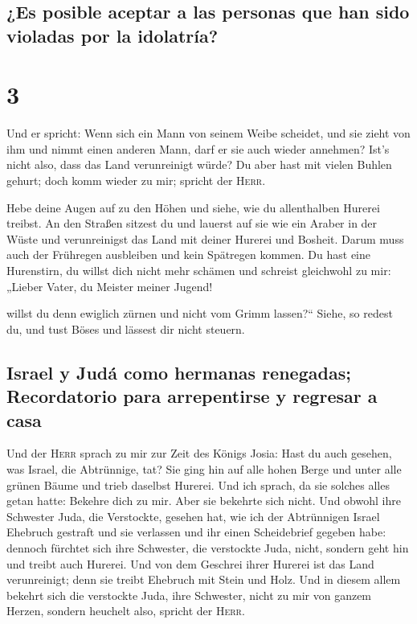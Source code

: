 \hypertarget{es-posible-aceptar-a-las-personas-que-han-sido-violadas-por-la-idolatruxeda}{%
\subsection{¿Es posible aceptar a las personas que han sido violadas por
la
idolatría?}\label{es-posible-aceptar-a-las-personas-que-han-sido-violadas-por-la-idolatruxeda}}

\hypertarget{section-2}{%
\section{3}\label{section-2}}

 Und er spricht: Wenn sich ein Mann von seinem Weibe
scheidet, und sie zieht von ihm und nimmt einen anderen Mann, darf er
sie auch wieder annehmen? Ist's nicht also, dass das Land verunreinigt
würde? Du aber hast mit vielen Buhlen gehurt; doch komm wieder zu mir;
spricht der \textsc{Herr}.

 Hebe deine Augen auf zu den Höhen und siehe, wie du
allenthalben Hurerei treibst. An den Straßen sitzest du und lauerst auf
sie wie ein Araber in der Wüste und verunreinigst das Land mit deiner
Hurerei und Bosheit.  Darum muss auch der Frühregen
ausbleiben und kein Spätregen kommen. Du hast eine Hurenstirn, du willst
dich nicht mehr schämen  und schreist gleichwohl zu mir:
„Lieber Vater, du Meister meiner Jugend!

 willst du denn ewiglich zürnen und nicht vom Grimm
lassen?{}`` Siehe, so redest du, und tust Böses und lässest dir nicht
steuern.

\hypertarget{israel-y-juduxe1-como-hermanas-renegadas-recordatorio-para-arrepentirse-y-regresar-a-casa}{%
\subsection{Israel y Judá como hermanas renegadas; Recordatorio para
arrepentirse y regresar a
casa}\label{israel-y-juduxe1-como-hermanas-renegadas-recordatorio-para-arrepentirse-y-regresar-a-casa}}

 Und der \textsc{Herr} sprach zu mir zur Zeit des Königs
Josia: Hast du auch gesehen, was Israel, die Abtrünnige, tat? Sie ging
hin auf alle hohen Berge und unter alle grünen Bäume und trieb daselbst
Hurerei.  Und ich sprach, da sie solches alles getan
hatte: Bekehre dich zu mir. Aber sie bekehrte sich nicht. Und obwohl
ihre Schwester Juda, die Verstockte, gesehen hat,  wie ich
der Abtrünnigen Israel Ehebruch gestraft und sie verlassen und ihr einen
Scheidebrief gegeben habe: dennoch fürchtet sich ihre Schwester, die
verstockte Juda, nicht, sondern geht hin und treibt auch Hurerei.
 Und von dem Geschrei ihrer Hurerei ist das Land
verunreinigt; denn sie treibt Ehebruch mit Stein und Holz.
 Und in diesem allem bekehrt sich die verstockte Juda,
ihre Schwester, nicht zu mir von ganzem Herzen, sondern heuchelt also,
spricht der \textsc{Herr}.

